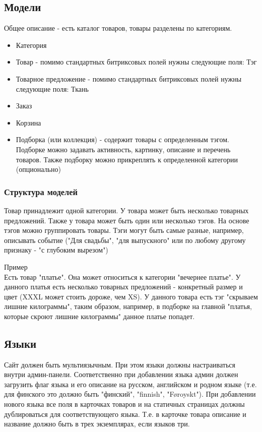 \documentclass[DIV=calc, paper=a4, fontsize=11pt]{scrartcl} %
\begin{document}
\subsection{Модели}
Общее описание - есть каталог товаров, товары разделены по категориям.

\begin{itemize}
	\item Категория
	\item Товар - помимо стандартных битриксовых полей нужны следующие поля: Тэг
	\item Товарное предложение - помимо стандартных битриксовых полей нужны следующие поля: Ткань
	\item Заказ
	\item Корзина
	\item Подборка (или коллекция) - содержит товары с определенным тэгом. Подборке можно задавать активность, картинку, описание и перечень товаров. Также подборку можно прикреплять к определенной категории (опционально)
\end{itemize}

\subsubsection{Структура моделей}

Товар принадлежит одной категории. У товара может быть несколько товарных предложений. Также у товара может быть один или несколько тэгов. На основе тэгов можно группировать товары. Тэги могут быть самые разные, например, описывать событие ("Для свадьбы", "для выпускного" или по любому другому признаку - "с глубоким вырезом")
\begin{framed}
Пример
\\[0.5cm]
Есть товар "платье". Она может относиться к категории "вечернее платье". У данного платья есть несколько товарных предложений - конкретный размер и цвет (XXXL может стоить дороже, чем XS). У данного товара есть тэг "скрываем лишние килограммы", таким образом, например, в подборке на главной "платья, которые скроют лишние килограммы" данное платье попадет.
\end{framed}

\subsection{Языки}
Сайт должен быть мультиязычным. При этом языки должны настраиваться внутри админ-панели. Соответственно при добавлении языка админ должен загрузить флаг языка и его описание на русском, английском и родном языке (т.е. для финского это должно быть "финский", "finnish", "Føroyskt"). При добавлении нового языка все поля в карточках товаров и на статичных страницах должны дублироваться для соответствующего языка. Т.е. в карточке товара описание и название должно быть в трех экземплярах, если языков три.
\end{document}
